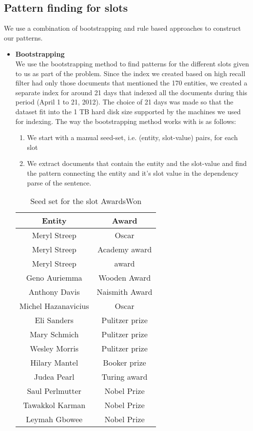 \subsection{Pattern finding for slots}
We use a combination of bootstrapping and rule based approaches to construct our patterns.
\begin{itemize}[label={}]
\item \textbf{Bootstrapping} \\
We use the bootstrapping method to find patterns for the different slots given to us as part of the problem. Since the index we created based on high recall filter had only those documents that mentioned the 170 entities, we created a separate index for around 21 days that indexed all the documents during this period (April 1 to 21, 2012). The choice of 21 days was made so that the dataset fit into the 1 TB hard disk size supported by the machines we used for indexing. The way the bootstrapping method works with is as follows:
\begin{enumerate}
\item We start with a manual seed-set, i.e. (entity, slot-value) pairs, for each slot
\item We extract documents that contain the entity and the slot-value and find the pattern connecting the entity and it’s slot value in the dependency parse of the sentence. 
\end{enumerate}

\begin{table}[ht]
\centering
\begin{tabular}{|c|c|}
\hline
Entity & Award \\
\hline
Meryl Streep & Oscar \\
Meryl Streep & Academy award \\
Meryl Streep & award \\
Geno Auriemma & Wooden Award \\
Anthony Davis & Naismith Award \\
Michel Hazanavicius & Oscar \\
Eli Sanders & Pulitzer prize \\ 
Mary Schmich & Pulitzer prize \\
Wesley Morris & Pulitzer prize \\
Hilary Mantel & Booker prize \\
Judea Pearl & Turing award \\
Saul Perlmutter & Nobel Prize \\
Tawakkol Karman & Nobel Prize \\ 
Leymah Gbowee & Nobel Prize \\
\hline
\end{tabular}
\caption{Seed set for the slot AwardsWon}
\label{tab:seedset_awardsWon}
\end{table}



\end{itemize}
